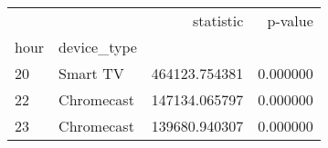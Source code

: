 \begin{tabular}{llrr}
\toprule
 &  & statistic & p-value \\
hour & device_type &  &  \\
\midrule
20 & Smart TV & 464123.754381 & 0.000000 \\
\cline{1-4}
22 & Chromecast & 147134.065797 & 0.000000 \\
\cline{1-4}
23 & Chromecast & 139680.940307 & 0.000000 \\
\cline{1-4}
\bottomrule
\end{tabular}
